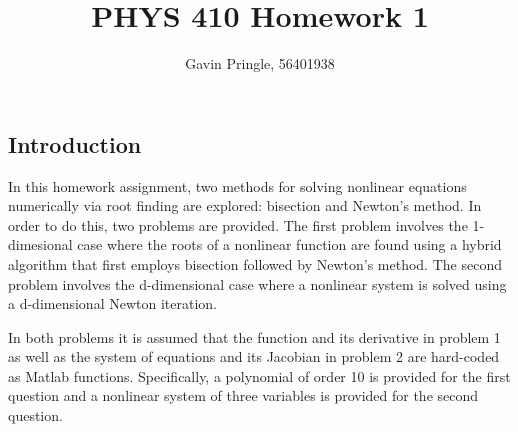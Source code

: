 \documentclass[10pt]{article}
\title{PHYS 410 Homework 1}
\author{Gavin Pringle, 56401938}
\begin{document}
\maketitle


\subsection*{Introduction}

In this homework assignment, two methods for solving nonlinear equations numerically via root finding 
are explored: bisection and Newton's method. In order to do this, two problems are provided. The first 
problem involves the 1-dimesional case where the roots of a nonlinear function are found using a hybrid 
algorithm that first employs bisection followed by Newton's method. The second problem involves the 
d-dimensional case where a nonlinear system is solved using a d-dimensional Newton iteration. 

In both problems it is assumed that the function and its derivative in problem 1 as well as the system of 
equations and its Jacobian in problem 2 are hard-coded as Matlab functions. Specifically, a polynomial
of order 10 is provided for the first question and a nonlinear system of three variables is provided 
for the second question. 

\pagebreak

\end{document}
